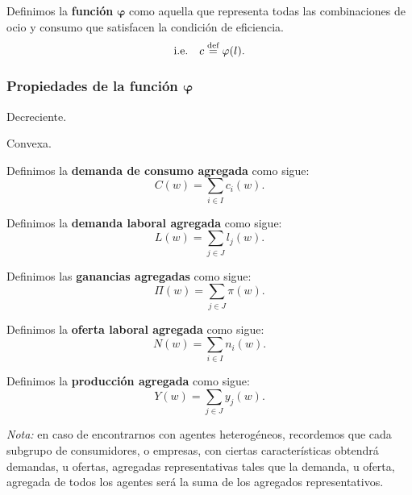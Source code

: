 \documentclass[8pt,a4paper]{extarticle}
\begin{document}
\begin{multicols}{3}
	\newpage

	\begin{boxdef}
		Definimos la \textbf{función} $\bm \varphi$ como aquella que representa todas las combinaciones de ocio y consumo que satisfacen la condición de eficiencia.
		\[\text{\normalfont i.e.} \quad c \stackrel{\text{\normalfont def}}{=} \varphi(l).\]
	\end{boxdef}

	\subsubsection*{Propiedades de la función $\bm \varphi$}

	\begin{eqlist}
		\item Decreciente.
		\item Convexa.
	\end{eqlist}

	\begin{boxdef}
		Definimos la \textbf{demanda de consumo agregada} como sigue:
		\[
			C(w) = \sum_{i \in I} c_i(w)
			.\]
	\end{boxdef}

	\begin{boxdef}
		Definimos la \textbf{demanda laboral agregada} como sigue:
		\[
			L(w) = \sum_{j \in J} l_j(w)
			.\]
	\end{boxdef}

	\begin{boxdef}
		Definimos las \textbf{ganancias agregadas} como sigue:
		\[
			\Pi(w) = \sum_{j \in J} \pi(w)
			.\]
	\end{boxdef}

	\begin{boxdef}
		Definimos la \textbf{oferta laboral agregada} como sigue:
		\[
			N(w) = \sum_{i \in I} n_i(w)
			.\]
	\end{boxdef}

	\begin{boxdef}
		Definimos la \textbf{producción agregada} como sigue:
		\[
			Y(w) = \sum_{j \in J} y_j(w)
			.\]
	\end{boxdef}

	\emph{Nota:} en caso de encontrarnos con agentes heterogéneos, recordemos que cada subgrupo de consumidores, o empresas, con ciertas características obtendrá demandas, u ofertas, agregadas representativas tales que la demanda, u oferta, agregada de todos los agentes será la suma de los agregados representativos.


\end{multicols}
\end{document}
